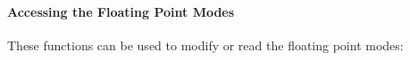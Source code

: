 \paragraph{Accessing the Floating Point Modes}

These functions can be used to modify or read the floating point modes:

